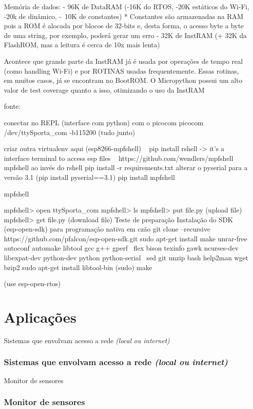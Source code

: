 \documentclass[10pt, compress]{beamer}
\begin{document}
    Memória de dados:
      - 96K de DataRAM (-16K do RTOS, -20K estáticos do Wi-Fi, -20k de dinâmico, -~10K de constantes)
      * Constantes são armazenadas na RAM pois a ROM é alocada por blocos de 32-bits e, desta forma, o acesso byte a byte de uma string, por exemplo, poderá gerar um erro
      - 32K de InstRAM (+ 32K da FlashROM, mas a leitura é cerca de 10x mais lenta)

      Acontece que grande parte da InstRAM já é usada por operações de tempo real (como handling Wi-Fi) e por ROTINAS usadas frequentemente.
      Essas rotinas, em muitos casos, já se encontram no BootROM. O Micropython possui um alto valor de test coverage quanto a isso, otimizando o uso da InstRAM

  fonte: 
    


  conectar no REPL (interface com python) com o picocom
  picocom /dev/ttyS{porta\_com} -b115200 (tudo junto)

  criar outra virtualenv aqui (esp8266-mpfshell)
  ~  pip install rshell -> it's a interface terminal to access esp files ~
  https://github.com/wendlers/mpfshell mpfshell ao invés do rshell
  pip install -r requirements.txt
  alterar o pyserial para a versão 3.1 (pip install pyserial==3.1)
  pip install mpfshell


  mpfshell

  mpfshell> open ttyS{porta\_com}
  mpfshell> ls
  mpfshell> put file.py (upload file)
  mpfshell> get file.py (download file)
  Teste de preparação Instalação do SDK (esp-open-sdk) para programação nativa em czão
  git clone --recursive https://github.com/pfalcon/esp-open-sdk.git
  sudo apt-get install make unrar-free autoconf automake libtool gcc g++ gperf \
      flex bison texinfo gawk ncurses-dev libexpat-dev python-dev python python-serial \
          sed git unzip bash help2man wget bzip2
  sudo apt-get install libtool-bin
  (sudo) make 

  (use esp-open-rtos)


\section{Aplicações}

\begin{frame}{Sistemas que envolvam acesso a rede \textit{(local ou internet)}}
  \frametitle{Sistemas que envolvam acesso a rede \textit{(local ou internet)}}
\end{frame}

\begin{frame}{Monitor de sensores}
  \frametitle{Monitor de sensores}
\end{frame}
\end{document}
